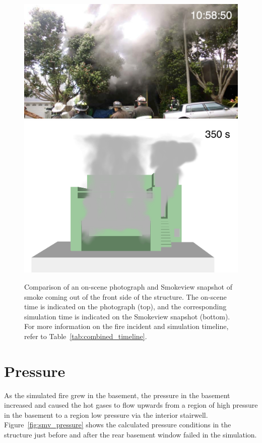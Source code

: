 \documentclass[12pt,oneside]{book}
\begin{document}
\begin{figure}[!ht]
\includegraphics[width=5.0in]{../Figures/Photo_Front_350_s}
\includegraphics[width=5.0in]{../Figures/SMV_Front_350_s}
\caption{Comparison of an on-scene photograph and Smokeview snapshot of smoke coming out of the front side of the structure. The on-scene time is indicated on the photograph (top), and the corresponding simulation time is indicated on the Smokeview snapshot (bottom). For more information on the fire incident and simulation timeline, refer to Table~\ref{tab:combined_timeline}.}
\label{fig:timeline_comparison_front}
\end{figure}


\clearpage


\section{Pressure}
\label{sec:pressure}

As the simulated fire grew in the basement, the pressure in the basement increased and caused the hot gases to flow upwards from a region of high pressure in the basement to a region low pressure via the interior stairwell. Figure~\ref{fig:smv_pressure} shows the calculated pressure conditions in the structure just before and after the rear basement window failed in the simulation.
\end{document}

